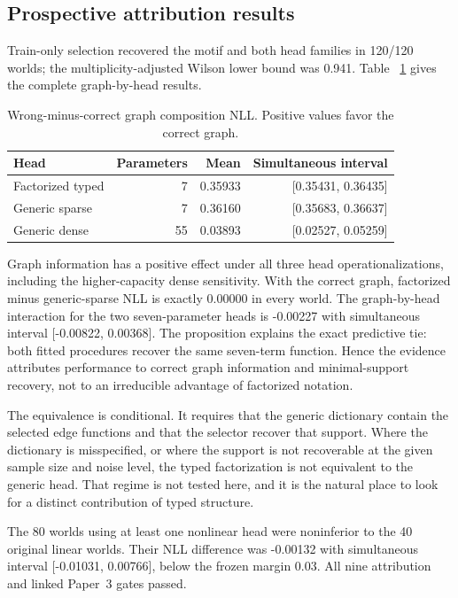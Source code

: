 \subsection{Prospective attribution results}

Train-only selection recovered the motif and both head families in 120/120
worlds; the multiplicity-adjusted Wilson lower bound was 0.941.  Table
~\ref{tab:prospective-attribution} gives the complete graph-by-head results.

\begin{table}[ht]
\centering
\caption{Wrong-minus-correct graph composition NLL. Positive values favor the
correct graph.}
\label{tab:prospective-attribution}
\begin{tabular}{lrrr}
\toprule
Head & Parameters & Mean & Simultaneous interval \\
\midrule
Factorized typed & 7 & 0.35933 & [0.35431, 0.36435] \\
Generic sparse & 7 & 0.36160 & [0.35683, 0.36637] \\
Generic dense & 55 & 0.03893 & [0.02527, 0.05259] \\
\bottomrule
\end{tabular}
\end{table}

Graph information has a positive effect under all three head
operationalizations, including the higher-capacity dense sensitivity.  With
the correct graph, factorized minus generic-sparse NLL is exactly 0.00000 in
every world.  The graph-by-head interaction for the two seven-parameter heads
is -0.00227 with simultaneous interval [-0.00822, 0.00368].  The proposition
explains the exact predictive tie: both fitted procedures recover the same
seven-term function.  Hence the evidence attributes performance to correct
graph information and minimal-support recovery, not to an irreducible advantage
of factorized notation.

The equivalence is conditional. It requires that the generic dictionary contain
the selected edge functions and that the selector recover that support. Where
the dictionary is misspecified, or where the support is not recoverable at the
given sample size and noise level, the typed factorization is not equivalent to
the generic head. That regime is not tested here, and it is the natural place to
look for a distinct contribution of typed structure.

The 80 worlds using at least one nonlinear head were noninferior to the 40
original linear worlds.  Their NLL difference was -0.00132 with simultaneous
interval [-0.01031, 0.00766], below the frozen margin 0.03.  All nine attribution
and linked Paper~3 gates passed.

